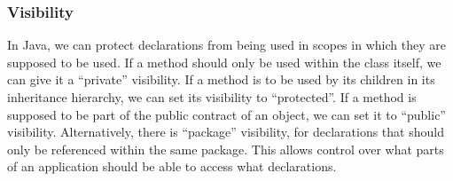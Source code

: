 \subsubsection{Visibility}
In Java, we can protect declarations from being used in scopes in which they are supposed to be used. If a method should only be used within the class itself, we can give it a ``private'' visibility. If a method is to be used by its children in its inheritance hierarchy, we can set its visibility to ``protected''. If a method is supposed to be part of the public contract of an object, we can set it to ``public'' visibility. Alternatively, there is ``package'' visibility, for declarations that should only be referenced within the same package. This allows control over what parts of an application should be able to access what declarations.
